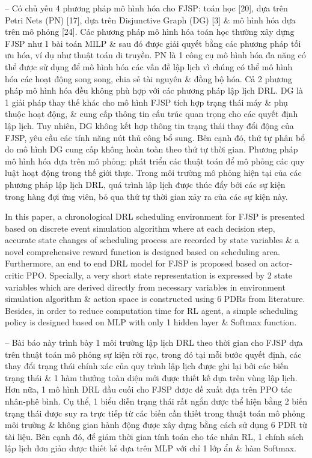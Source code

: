 \documentclass{article}
\begin{document}
\begin{itemize}
    -- Có chủ yếu 4 phương pháp mô hình hóa cho FJSP: toán học [20], dựa trên Petri Nets (PN) [17], dựa trên Disjunctive Graph (DG) [3] \& mô hình hóa dựa trên mô phỏng [24]. Các phương pháp mô hình hóa toán học thường xây dựng FJSP như 1 bài toán MILP \& sau đó được giải quyết bằng các phương pháp tối ưu hóa, ví dụ như thuật toán di truyền. PN là 1 công cụ mô hình hóa đa năng có thể được sử dụng để mô hình hóa các vấn đề lập lịch vì chúng có thể mô hình hóa các hoạt động song song, chia sẻ tài nguyên \& đồng bộ hóa. Cả 2 phương pháp mô hình hóa đều không phù hợp với các phương pháp lập lịch DRL. DG là 1 giải pháp thay thế khác cho mô hình FJSP tích hợp trạng thái máy \& phụ thuộc hoạt động, \& cung cấp thông tin cấu trúc quan trọng cho các quyết định lập lịch. Tuy nhiên, DG không kết hợp thông tin trạng thái thay đổi động của FJSP, yêu cầu các tính năng nút thủ công bổ sung. Bên cạnh đó, thứ tự phân bổ do mô hình DG cung cấp không hoàn toàn theo thứ tự thời gian. Phương pháp mô hình hóa dựa trên mô phỏng: phát triển các thuật toán để mô phỏng các quy luật hoạt động trong thế giới thực. Trong môi trường mô phỏng hiện tại của các phương pháp lập lịch DRL, quá trình lập lịch được thúc đẩy bởi các sự kiện trong hàng đợi ứng viên, bỏ qua thứ tự thời gian xảy ra của các sự kiện này.

    In this paper, a chronological DRL scheduling environment for FJSP is presented based on discrete event simulation algorithm where at each decision step, accurate state changes of scheduling process are recorded by state variables \& a novel comprehensive reward function is designed based on scheduling area. Furthermore, an end to end DRL model for FJSP is proposed based on actor-critic PPO. Specially, a very short state representation is expressed by 2 state variables which are derived directly from necessary variables in environment simulation algorithm \& action space is constructed using 6 PDRs from literature. Besides, in order to reduce computation time for RL agent, a simple scheduling policy is designed based on MLP with only 1 hidden layer \& Softmax function.

    -- Bài báo này trình bày 1 môi trường lập lịch DRL theo thời gian cho FJSP dựa trên thuật toán mô phỏng sự kiện rời rạc, trong đó tại mỗi bước quyết định, các thay đổi trạng thái chính xác của quy trình lập lịch được ghi lại bởi các biến trạng thái \& 1 hàm thưởng toàn diện mới được thiết kế dựa trên vùng lập lịch. Hơn nữa, 1 mô hình DRL đầu cuối cho FJSP được đề xuất dựa trên PPO tác nhân-phê bình. Cụ thể, 1 biểu diễn trạng thái rất ngắn được thể hiện bằng 2 biến trạng thái được suy ra trực tiếp từ các biến cần thiết trong thuật toán mô phỏng môi trường \& không gian hành động được xây dựng bằng cách sử dụng 6 PDR từ tài liệu. Bên cạnh đó, để giảm thời gian tính toán cho tác nhân RL, 1 chính sách lập lịch đơn giản được thiết kế dựa trên MLP với chỉ 1 lớp ẩn \& hàm Softmax.


\end{itemize}
\end{document}
